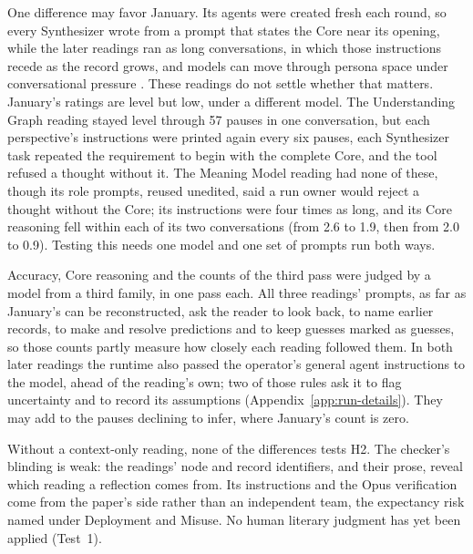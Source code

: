 \documentclass[11pt]{article}
\begin{document}
One difference may favor January. Its agents were created fresh each round, so
every Synthesizer wrote from a prompt that states the Core near its opening,
while the later readings ran as long conversations, in which those instructions
recede as the record grows, and models can move through persona space under
conversational pressure \cite{lu2026assistantaxissituatingstabilizing}. These
readings do not settle whether that matters. January's ratings are level but low,
under a different model. The Understanding Graph reading stayed level through 57
pauses in one conversation, but each perspective's instructions were printed
again every six pauses, each Synthesizer task repeated the requirement to begin
with the complete Core, and the tool refused a thought without it. The Meaning
Model reading had none of these, though its role prompts, reused unedited, said a
run owner would reject a thought without the Core; its instructions were four
times as long, and its Core reasoning fell within each of its two conversations (from 2.6 to 1.9,
then from 2.0 to 0.9). Testing this needs one model and one set of prompts run
both ways.

Accuracy, Core
reasoning and the counts of the third pass were judged by a model from a third
family, in one pass each. All three readings' prompts, as far as January's can be
reconstructed, ask the reader to look back, to name earlier records, to make
and resolve predictions and to keep guesses marked as guesses, so those counts
partly measure how closely each reading followed them. In both later readings the
runtime also passed the operator's general agent instructions to the model, ahead
of the reading's own; two of those rules ask it to flag uncertainty and to record
its assumptions (Appendix~\ref{app:run-details}). They may add to the pauses
declining to infer, where January's count is zero.

Without a context-only reading, none of the differences tests H2. The checker's blinding is weak:
the readings' node and record identifiers, and their prose, reveal which
reading a reflection comes from. Its instructions and the Opus verification come from the paper's side rather than an independent team, the expectancy risk named under Deployment and Misuse. No human literary judgment has yet been
applied (Test~1).
\end{document}
